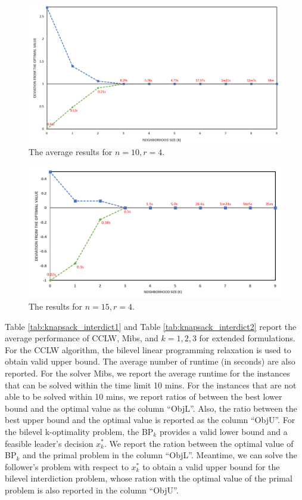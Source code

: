 \documentclass[11pt]{article}
\begin{document}
\begin{figure}
	\centering
	\includegraphics[width=\textwidth]{img/result_DNEG_n15k4.PNG}
	\caption{The average results for $n=10, r=4$.}
	\label{fig:n10k1j4}
\end{figure}
\begin{figure}
	\centering
	\includegraphics[width=\textwidth]{img/result_DNEG_n15k4j0.PNG}
	\caption{The results for $n=15, r=4$.}
	\label{fig:n15k4j0}
\end{figure}



Table \ref{tab:knapsack_interdict1} and Table \ref{tab:knapsack_interdict2} report the average performance of CCLW, Mibs, and $k=1,2,3$ for extended formulations. For the CCLW  algorithm, the bilevel linear programming relaxation is used to obtain valid upper bound.  The average number of runtime (in seconds) are also reported. For the solver Mibs, we report the average runtime for the instances that can be solved within the time limit 10 mins. For the instances that are not able to be solved within 10 mins, we report ratios of between the best lower bound and the optimal value as the column ``ObjL''. Also, the ratio between the best upper bound and the optimal value is reported as the column ``ObjU''. For the bilevel k-optimality problem, the BP$_k$ provides a valid lower bound and a feasible leader's decision $x^*_k$. We report the ration between the optimal value of BP$_k$ and the primal problem in the column ``ObjL''. Meantime, we can solve the follower's problem with respect to $x^*_k$ to obtain a valid upper bound for the bilevel interdiction problem, whose ration with the optimal value of the primal problem is also reported in the column ``ObjU''.
\end{document}
